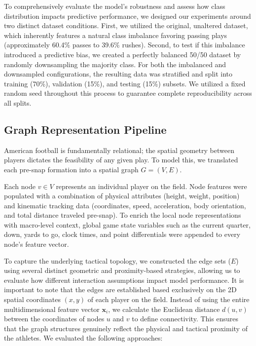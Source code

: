 \documentclass[runningheads]{llncs}
\begin{document}
To comprehensively evaluate the model's robustness and assess how class distribution impacts predictive performance, we designed our experiments around two distinct dataset conditions. First, we utilized the original, unaltered dataset, which inherently features a natural class imbalance favoring passing plays (approximately 60.4\% passes to 39.6\% rushes). Second, to test if this imbalance introduced a predictive bias, we created a perfectly balanced 50/50 dataset by randomly downsampling the majority class. For both the imbalanced and downsampled configurations, the resulting data was stratified and split into training (70\%), validation (15\%), and testing (15\%) subsets. We utilized a fixed random seed throughout this process to guarantee complete reproducibility across all splits.

\subsection{Graph Representation Pipeline}
\label{subsec:graph_construction}

American football is fundamentally relational; the spatial geometry between players dictates the feasibility of any given play. To model this, we translated each pre-snap formation into a spatial graph $G = (V, E)$. 

Each node $v \in V$ represents an individual player on the field. Node features were populated with a combination of physical attributes (height, weight, position) and kinematic tracking data (coordinates, speed, acceleration, body orientation, and total distance traveled pre-snap). To enrich the local node representations with macro-level context, global game state variables such as the current quarter, down, yards to go, clock times, and point differentials were appended to every node's feature vector.

To capture the underlying tactical topology, we constructed the edge sets ($E$) using several distinct geometric and proximity-based strategies, allowing us to evaluate how different interaction assumptions impact model performance. It is important to note that the edges are established based exclusively on the 2D spatial coordinates $(x,y)$ of each player on the field. Instead of using the entire multidimensional feature vector $\mathbf{x}_i$, we calculate the Euclidean distance $d(u,v)$ between the coordinates of nodes $u$ and $v$ to define connectivity. This ensures that the graph structures genuinely reflect the physical and tactical proximity of the athletes. We evaluated the following approaches:
\end{document}
